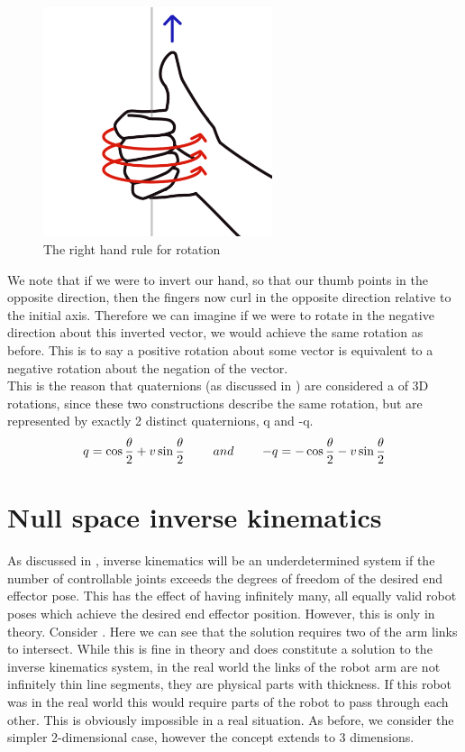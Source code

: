 \begin{figure}[h]
    \centering
    \includegraphics[width=0.6\textwidth]{figures/right-hand-rule.png}
    \caption{The right hand rule for rotation}
    \label{fig:right-hand-rule}
\end{figure}

We note that if we were to invert our hand, so that our thumb points in the opposite direction, then the fingers now curl in the opposite direction relative to the initial axis. Therefore we can imagine if we were to rotate in the negative direction about this inverted vector, we would achieve the same rotation as before. This is to say a positive rotation about some vector is equivalent to a negative rotation about the negation of the vector.\\

This is the reason that quaternions (as discussed in ) are considered a  of 3D rotations, since these two constructions describe the same rotation, but are represented by exactly 2 distinct quaternions, q and -q.
$$ q = \cos{\frac{\theta}{2}} + v\sin{\frac{\theta}{2}} \operatorname{\operatorname{\: \: \: \:} \operatorname{\: \: \: \:}} and \operatorname{\operatorname{\: \: \: \:} \operatorname{\: \: \: \:}} -q = -\cos{\frac{\theta}{2}} - v\sin{\frac{\theta}{2}}$$


\chapter{Null space inverse kinematics}
\label{apx:null-space}
As discussed in , inverse kinematics will be an underdetermined system if the number of controllable joints exceeds the degrees of freedom of the desired end effector pose. This has the effect of having infinitely many, all equally valid robot poses which achieve the desired end effector position. However, this is only in theory. Consider . Here we can see that the solution requires two of the arm links to intersect. While this is fine in theory and does constitute a solution to the inverse kinematics system, in the real world the links of the robot arm are not infinitely thin line segments, they are physical parts with thickness. If this robot was in the real world this would require parts of the robot to pass through each other. This is obviously impossible in a real situation. As before, we consider the simpler 2-dimensional case, however the concept extends to 3 dimensions.

